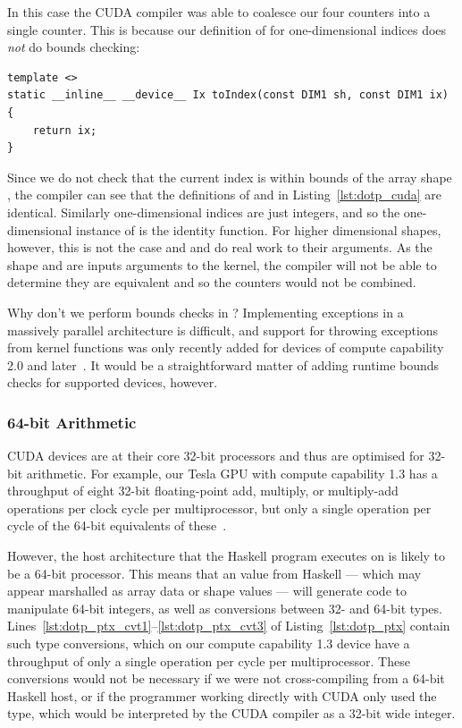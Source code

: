 In this case the CUDA compiler was able to coalesce our four counters into a
single counter. This is because our definition of  for
one-dimensional indices does \emph{not} do bounds checking:
%
\begin{lstlisting}[style=cuda]
template <>
static __inline__ __device__ Ix toIndex(const DIM1 sh, const DIM1 ix)
{
    return ix;
}
\end{lstlisting}
%
Since we do not check that the current index  is within bounds of the
array shape , the compiler can see that the definitions of 
and  in Listing~\ref{lst:dotp_cuda} are identical. Similarly
one-dimensional indices are just integers, and so the one-dimensional instance
of  is the identity function. For higher dimensional shapes,
however, this is not the case and  and  do real work
to their arguments. As the shape  and  are inputs
arguments to the kernel, the compiler will not be able to determine they are
equivalent and so the counters would not be combined.

Why don't we perform bounds checks in ? Implementing exceptions in
a massively parallel architecture is difficult, and support for throwing
exceptions from kernel functions was only recently added for devices of compute
capability 2.0 and later~\cite{NVIDIA:2012wf}. %
It would be a straightforward matter of adding runtime bounds checks for
supported devices, however.


\subsubsection{64-bit Arithmetic}

CUDA devices are at their core 32-bit processors and thus are optimised for
32-bit arithmetic. For example, our Tesla GPU with compute capability 1.3 has a
throughput of eight 32-bit floating-point add, multiply, or multiply-add
operations per clock cycle per multiprocessor, but only a single operation per
cycle of the 64-bit equivalents of these~\cite{NVIDIA:2012wf}. %

However, the host architecture that the Haskell program executes on is likely to
be a 64-bit processor. This means that an  value from Haskell ---
which may appear marshalled as array data or shape values --- will generate code
to manipulate 64-bit integers, as well as conversions between 32- and 64-bit
types. Lines~\ref{lst:dotp_ptx_cvt1}--\ref{lst:dotp_ptx_cvt3} of
Listing~\ref{lst:dotp_ptx} contain such type conversions, which on our compute
capability 1.3 device have a throughput of only a single operation per cycle per
multiprocessor. These conversions would not be necessary if we were not
cross-compiling from a 64-bit Haskell host, or if the programmer working
directly with CUDA only used the  type, which would be interpreted by
the CUDA compiler as a 32-bit wide integer.


